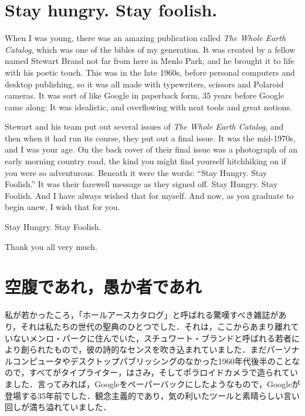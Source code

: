 \documentclass[twocolumn]{jsarticle}
\begin{document}
\newpage


\section*{Stay hungry. Stay foolish.}

When I was young, there was an amazing publication called \textit{The Whole Earth Catalog}, which was one of the bibles of my generation. It was created by a fellow named Stewart Brand not far from here in Menlo Park, and he brought it to life with his poetic touch. This was in the late 1960s, before personal computers and desktop publishing, so it was all made with typewriters, scissors and Polaroid cameras. It was sort of like Google in paperback form, 35 years before Google came along: It was idealistic, and overflowing with neat tools and great notions.

\vspace{\baselineskip}
\vspace{\baselineskip}


Stewart and his team put out several issues of \textit{The Whole Earth Catalog}, and then when it had run its course, they put out a final issue. It was the mid-1970s, and I was your age. On the back cover of their final issue was a photograph of an early morning country road, the kind you might find yourself hitchhiking on if you were so adventurous. Beneath it were the words: ``Stay Hungry. Stay Foolish.'' It was their farewell message as they signed off. Stay Hungry. Stay Foolish. And I have always wished that for myself. And now, as you graduate to begin anew, I wish that for you.

Stay Hungry. Stay Foolish.

Thank you all very much.

\newpage

\section*{空腹であれ，愚か者であれ}

私が若かったころ，「ホールアースカタログ」と呼ばれる驚嘆すべき雑誌があり，それは私たちの世代の聖典のひとつでした．それは，ここからあまり離れていないメンロ・パークに住んでいた，スチュワート・ブランドと呼ばれる若者により創られたもので，彼の詩的なセンスを吹き込まれていました．まだパーソナルコンピュータやデスクトップパブリッシングのなかった1960年代後半のことなので，すべてがタイプライター，はさみ，そしてポラロイドカメラで造られていました．言ってみれば，Googleをペーパーバックにしたようなもので，Googleが登場する35年前でした．観念主義的であり，気の利いたツールと素晴らしい言い回しが満ち溢れていました．
\end{document}
